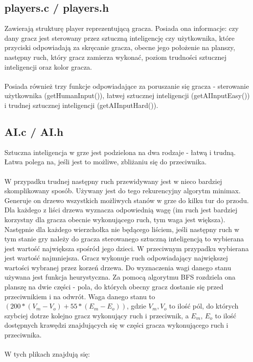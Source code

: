 \documentclass[11pt]{article}
\begin{document}
		\subsection{players.c / players.h}
		\noindent Zawierają strukturę player reprezentującą gracza. Posiada ona informacje: czy dany gracz jest sterowany przez sztuczną inteligencję czy użytkownika, które przyciski odpowiadają za skręcanie gracza, obecne jego położenie na planszy, następny ruch, który gracz zamierza wykonać, poziom trudności sztucznej inteligencji oraz kolor gracza.
		\\
		\\
		\noindent Posiada również trzy funkcje odpowiadające za poruszanie się gracza - sterowanie użytkownika (getHumanInput()), łatwej sztucznej inteligencji (getAIInputEasy()) i trudnej sztucznej inteligencji (getAIInputHard()).

		\subsection{AI.c / AI.h}
		\noindent Sztuczna inteligencja w grze jest podzielona na dwa rodzaje - łatwą i trudną. Łatwa polega na, jeśli jest to możliwe, zbliżaniu się do przeciwnika.
		\\
		\\
		\noindent W przypadku trudnej następny ruch przewidywany jest w nieco bardziej skomplikowany sposób. Używany jest do tego rekurencyjny algorytm minimax. Generuje on drzewo wszystkich możliwych stanów w grze do kilku tur do przodu. Dla każdego z liści drzewa wyznacza odpowiednią wagę (im ruch jest bardziej korzystny dla gracza obecnie wykonującego ruch, tym waga jest większa). Następnie dla każdego wierzchołka nie będącego liściem, jeśli następny ruch w tym stanie gry należy do gracza sterowanego sztuczną inteligencją to wybierana jest wartość największa spośród jego dzieci. W przeciwnym przypadku wybierana jest wartość najmniejsza. Gracz wykonuje ruch odpowiadający największej wartości wybranej przez korzeń drzewa. Do wyznaczenia wagi danego stanu używana jest funkcja heurystyczna. Za pomocą algorytmu BFS rozdziela ona planszę na dwie części - pola, do których obecny gracz dostanie się przed przeciwnikiem i na odwrót. Waga danego stanu to $(200 * (V_m - V_o) + 55 * (E_m - E_o))$, gdzie $V_m, V_o$ to ilość pól, do których szybciej dotrze kolejno gracz wykonujący ruch i przeciwnik, a $E_m$, $E_o$ to ilość dostępnych krawędzi znajdujących się w części gracza wykonującego ruch i przeciwnika.
		\\
		\\
		W tych plikach znajdują się:
\end{document}
